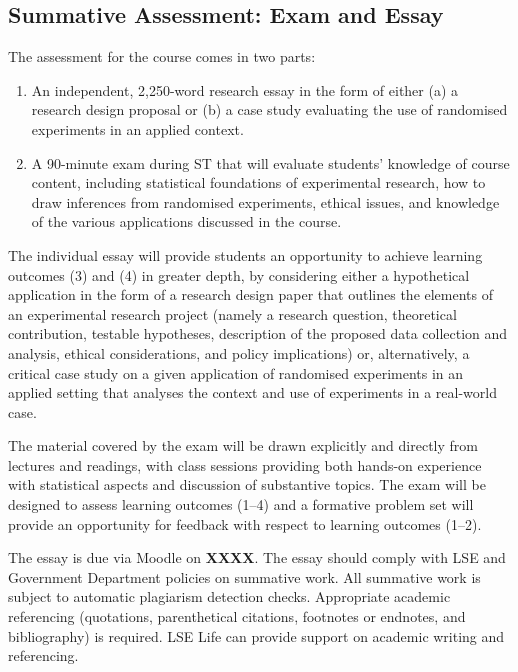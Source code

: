 \documentclass[12pt,a4paper]{article}
\begin{document}
\subsection{Summative Assessment: Exam and Essay}

The assessment for the course comes in two parts:

\begin{enumerate}
\item An independent, 2,250-word research essay in the form of either (a) a research design proposal or (b) a case study evaluating the use of randomised experiments in an applied context.
\item A 90-minute exam during ST that will evaluate students' knowledge of course content, including statistical foundations of experimental research, how to draw inferences from randomised experiments, ethical issues, and knowledge of the various applications discussed in the course.
\end{enumerate}

\noindent The individual essay will provide students an opportunity to achieve learning outcomes (3) and (4) in greater depth, by considering either a hypothetical application in the form of a research design paper that outlines the elements of an experimental research project (namely a research question, theoretical contribution, testable hypotheses, description of the proposed data collection and analysis, ethical considerations, and policy implications) or, alternatively, a critical case study on a given application of randomised experiments in an applied setting that analyses the context and use of experiments in a real-world case.

The material covered by the exam will be drawn explicitly and directly from lectures and readings, with class sessions providing both hands-on experience with statistical aspects and discussion of substantive topics. The exam will be designed to assess learning outcomes (1--4) and a formative problem set will provide an opportunity for feedback with respect to learning outcomes (1--2).

The essay is due via Moodle on \textbf{XXXX}. The essay should comply with LSE and Government Department policies on summative work. All summative work is subject to automatic plagiarism detection checks. Appropriate academic referencing (quotations, parenthetical citations, footnotes or endnotes, and bibliography) is required. LSE Life can provide support on academic writing and referencing.
\end{document}
